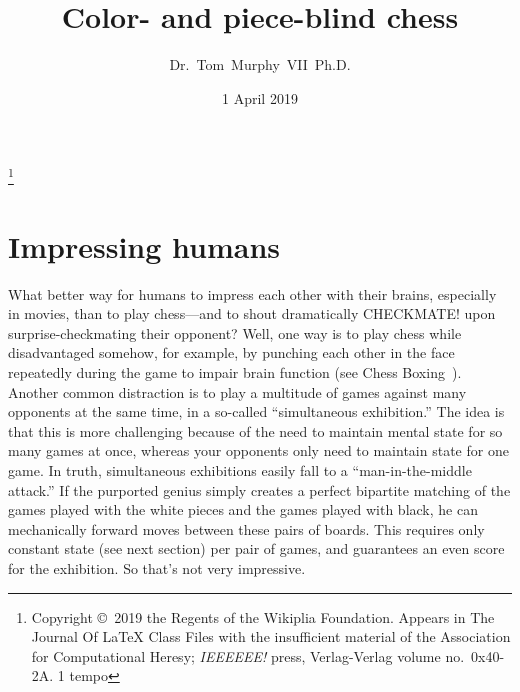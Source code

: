 \documentclass[twocolumn]{amsart}
\begin{document}
 

\title{Color- and piece-blind chess}
\author{Dr.~Tom~Murphy~VII~Ph.D.}\thanks{
Copyright \copyright\ 2019 the Regents of the Wikiplia Foundation.
Appears in The Journal Of LaTeX Class Files with the insufficient
material of the Association for Computational Heresy; {\em IEEEEEE!}
press, Verlag-Verlag volume no.~0x40-2A. 1 tempo}


\newcommand\checkmate{\hspace{-.05em}\raisebox{.4ex}{\tiny\bf ++}}

\renewcommand\th{\ensuremath{{}^{\textrm{th}}}}
\newcommand\st{\ensuremath{{}^{\textrm{st}}}}
\newcommand\rd{\ensuremath{{}^{\textrm{rd}}}}
\newcommand\nd{\ensuremath{{}^{\textrm{nd}}}}
\newcommand\at{\ensuremath{\scriptstyle @}}

\date{1 April 2019}

\maketitle \thispagestyle{empty}


\section{Impressing humans}

What better way for humans to impress each other with their brains,
especially in movies, than to play chess---and to shout dramatically
CHECKMATE! upon surprise-checkmating their opponent? Well, one way is
to play chess while disadvantaged somehow, for example, by punching
each other in the face repeatedly during the game to impair brain
function (see Chess Boxing~\cite{wikipediachessboxing}). Another
common distraction is to play a multitude of games against many
opponents at the same time, in a so-called ``simultaneous
exhibition.'' The idea is that this is more challenging because of the
need to maintain mental state for so many games at once, whereas your
opponents only need to maintain state for one game. In truth,
simultaneous exhibitions easily fall to a ``man-in-the-middle
attack.'' If the purported genius simply creates a perfect bipartite
matching of the games played with the white pieces and the games
played with black, he can mechanically forward moves between these
pairs of boards. This requires only constant state (see next section)
per pair of games, and guarantees an even score for the exhibition. So
that's not very impressive.
\end{document}
